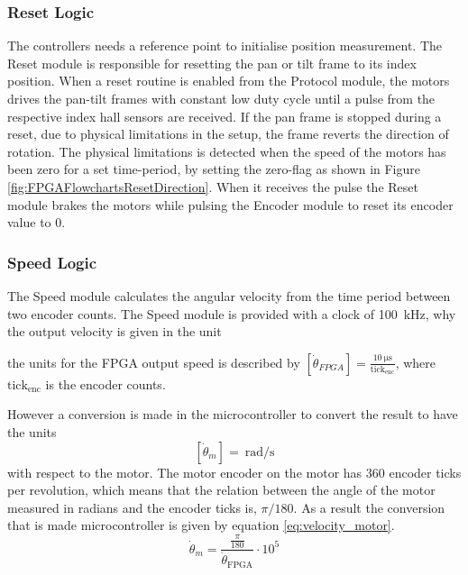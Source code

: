 \documentclass[../../main.tex]{subfiles}
\begin{document}
\subsubsection*{Reset Logic}
The controllers needs a reference point to initialise position measurement.
The Reset module is responsible for resetting the pan or tilt frame to its index position. When a reset routine is enabled from the Protocol module, the motors drives the pan-tilt frames with constant low duty cycle until a pulse from the respective index hall sensors are received. If the pan frame is stopped during a reset, due to physical limitations in the setup, the frame reverts the direction of rotation. The physical limitations is detected when the speed of the motors has been zero for a set time-period, by setting the zero-flag as shown in Figure \ref{fig:FPGAFlowchartsResetDirection}. When it receives the pulse the Reset module brakes the motors while pulsing the Encoder module to reset its encoder value to 0. 




\subsubsection*{Speed Logic}
The Speed module calculates the angular velocity from the time period between two encoder counts. The Speed module is provided with a clock of \SI{100}{\kilo \hertz}, why the output velocity is given in the unit 

the units for the FPGA output speed is described by $\left[\dot{\theta}_{FPGA}\right] = \frac{\SI{10}{\micro \second}}{\mathrm{tick_{enc}}}$, where $\mathrm{tick_{enc}}$ is the encoder counts.

However a conversion is made in the microcontroller to convert the result to have the units \[ \left[ \dot{\theta}_m \right] = \SI{}{\radian \per \second } \] with respect to the motor. The motor encoder on the motor has 360 encoder ticks per revolution, which means that the relation between the angle of the motor measured in radians and the encoder ticks is, $\pi / 180$. As a result the conversion that is made microcontroller is given by equation \ref{eq:velocity_motor}.
\begin{equation}\label{eq:velocity_motor}
    \dot{\theta}_{m} = \frac{\frac{\pi}{180}}{ \dot{\theta}_{\mathrm{FPGA}} }\cdot 10^{5}
\end{equation}
\end{document}
